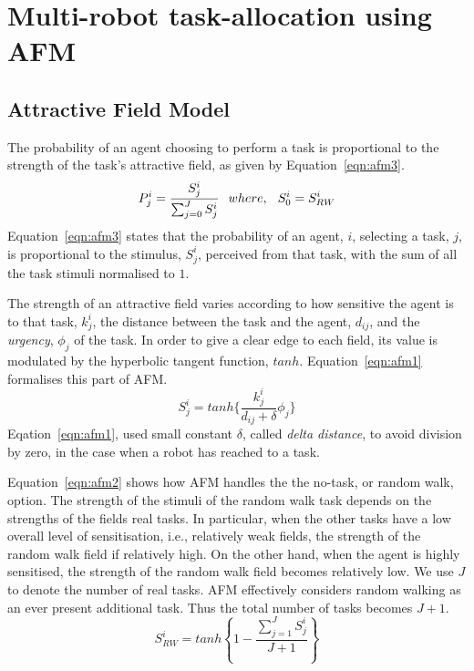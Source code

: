 \documentclass[journal]{IEEEtran}
\begin{document}
\section{Multi-robot task-allocation using AFM}
\label{sec:afm-mrta}
\subsection{Attractive Field Model}
The probability of an agent choosing to perform a task is proportional to the strength of the task's attractive field, as given by Equation~\ref{eqn:afm3}.
\begin{equation}
P_{j}^{i} = \frac{S_{j}^{i}}{\sum_{j=0}^{J} S_{j}^{i}} \hspace*{0.25cm}where,\hspace*{0.25cm}S^{i}_{0} = S^{i}_{RW}   
\label{eqn:afm3}
\end{equation}
Equation~\ref{eqn:afm3} states that the probability of an agent, $i$, selecting a task, $j$, is proportional to the stimulus, $ S^i_j$, perceived from that task, with the sum of all the task stimuli normalised to $1$.

The strength of an attractive field varies according to how sensitive the agent is to that task, $k_{j}^{i}$, the distance between the task and the agent, $d_{ij}$, and the {\em urgency}, $\phi _{j}$ of the task.  In order to give a clear edge to each field, its value is modulated by the hyperbolic tangent function, $tanh$.  Equation~\ref{eqn:afm1} formalises this part of AFM.
\begin{equation}
S_{j}^{i} = tanh\{\frac{k_{j}^{i}}{d_{ij}+\delta } \phi _{j}\}
\label{eqn:afm1}
\end{equation}
Eqation~\ref{eqn:afm1}, used small constant $\delta$, called {\em delta distance}, to avoid division by zero, in the case when a robot has reached to a task.

Equation~\ref{eqn:afm2} shows how AFM handles the the no-task, or random walk, option.  The strength of the stimuli of the random walk task depends on the strengths of the fields real tasks.  In particular, when the other tasks have a low overall level of sensitisation, i.e., relatively weak fields, the strength of the random walk field if relatively high.  On the other hand, when the agent is highly sensitised, the strength of the random walk field becomes relatively low.  We use $J$ to denote the number of real tasks.  AFM effectively considers random walking as an ever present additional task.  Thus the total number of tasks becomes $J+1$. %
\begin{equation}
S^{i}_{RW} = tanh \left \{ 1 -  \frac{ \sum_{j=1}^{J} S^{i}_{j}}{J + 1} \right \}
\label{eqn:afm2}
\end{equation}
\end{document}
